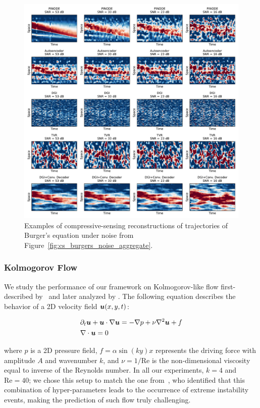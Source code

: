 \begin{figure}
	\centering
	\includegraphics[width=\textwidth]{figures/cs_burgers_noise_examples.pdf}
	\caption{\label{fig:cs_burgers_noise_examples} Examples of compressive-sensing reconstructions of trajectories of Burger's equation under noise from Figure~\ref{fig:cs_burgers_noise_aggregate}.}
\end{figure}

 


\subsubsection{Kolmogorov Flow}
\label{sec:kolmogorov_flow}
We study the performance of our framework on Kolmogorov-like flow first-described by~\cite{dovzhenko1981generation} and later analyzed by \cite{tithof2017bifurcations,suri2017forecasting}. The following equation describes the behavior of a 2D velocity field $\boldsymbol{u}(x, y, t)$:


\begin{align}
\label{eq:kolmogorov_flow_definition}
	& \partial_t \boldsymbol{u} + \boldsymbol{u} \cdot \nabla \boldsymbol{u} = -\nabla p + \nu\nabla^2\boldsymbol{u} + f \\
	& \nabla \cdot \boldsymbol{u} = 0
\end{align}

where $p$ is a 2D pressure field, $f = \alpha\sin(ky)x$ represents the driving force with amplitude $A$ and wavenumber $k$, and $\nu = 1/\text{Re}$ is the non-dimensional viscosity equal to inverse of the Reynolds number. In all our experiments, $k = 4$ and $\text{Re} = 40$; we chose this setup to match the one from~\cite{wan2018data}, who identified that this combination of hyper-parameters leads to the occurrence of extreme instability events, making the prediction of such flow truly challenging. 

